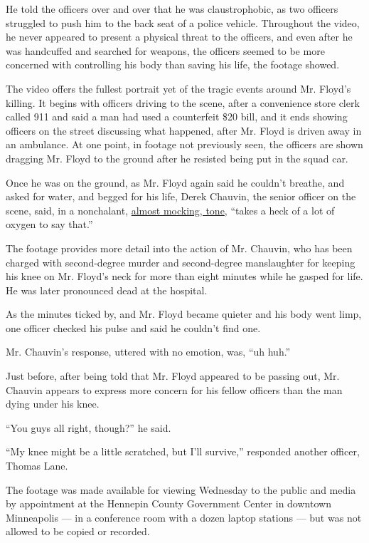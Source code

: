 He told the officers over and over that he was claustrophobic, as two
officers struggled to push him to the back seat of a police vehicle.
Throughout the video, he never appeared to present a physical threat to
the officers, and even after he was handcuffed and searched for weapons,
the officers seemed to be more concerned with controlling his body than
saving his life, the footage showed.

The video offers the fullest portrait yet of the tragic events around
Mr. Floyd's killing. It begins with officers driving to the scene, after
a convenience store clerk called 911 and said a man had used a
counterfeit \$20 bill, and it ends showing officers on the street
discussing what happened, after Mr. Floyd is driven away in an
ambulance. At one point, in footage not previously seen, the officers
are shown dragging Mr. Floyd to the ground after he resisted being put
in the squad car.

Once he was on the ground, as Mr. Floyd again said he couldn't breathe,
and asked for water, and begged for his life, Derek Chauvin, the senior
officer on the scene, said, in a nonchalant,
\href{https://www.nytimes3xbfgragh.onion/2020/07/08/us/george-floyd-body-camera-transcripts.html}{almost
mocking, tone}, ``takes a heck of a lot of oxygen to say that.''

The footage provides more detail into the action of Mr. Chauvin, who has
been charged with second-degree murder and second-degree manslaughter
for keeping his knee on Mr. Floyd's neck for more than eight minutes
while he gasped for life. He was later pronounced dead at the hospital.

As the minutes ticked by, and Mr. Floyd became quieter and his body went
limp, one officer checked his pulse and said he couldn't find one.

Mr. Chauvin's response, uttered with no emotion, was, ``uh huh.''

Just before, after being told that Mr. Floyd appeared to be passing out,
Mr. Chauvin appears to express more concern for his fellow officers than
the man dying under his knee.

``You guys all right, though?'' he said.

``My knee might be a little scratched, but I'll survive,'' responded
another officer, Thomas Lane.

The footage was made available for viewing Wednesday to the public and
media by appointment at the Hennepin County Government Center in
downtown Minneapolis --- in a conference room with a dozen laptop
stations --- but was not allowed to be copied or recorded.

